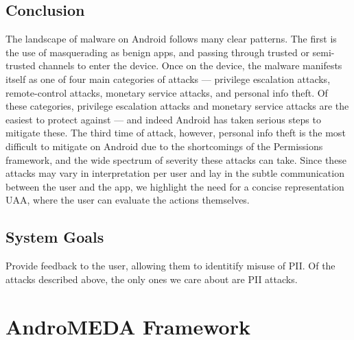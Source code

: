 \documentclass{acm_proc_article-sp}
\begin{document}
\subsection{Conclusion}
The landscape of malware on Android follows many clear patterns. The first is the use of masquerading as benign apps, and passing through trusted or semi-trusted channels to enter the device. Once on the device, the malware manifests itself as one of four main categories of attacks --- privilege escalation attacks, remote-control attacks, monetary service attacks, and personal info theft. Of these categories, privilege escalation attacks and monetary service attacks are the easiest to protect against --- and indeed Android has taken serious steps to mitigate these. The third time of attack, however, personal info theft is the most difficult to mitigate on Android due to the shortcomings of the Permissions framework, and the wide spectrum of severity these attacks can take. Since these attacks may vary in interpretation per user and lay in the subtle communication between the user and the app, we highlight the need for a concise representation UAA, where the user can evaluate the actions themselves.


\subsection{System Goals}
Provide feedback to the user, allowing them to identitify misuse of PII. Of the attacks described above, the only ones we care about are PII attacks.































\section{AndroMEDA Framework}
\end{document}
